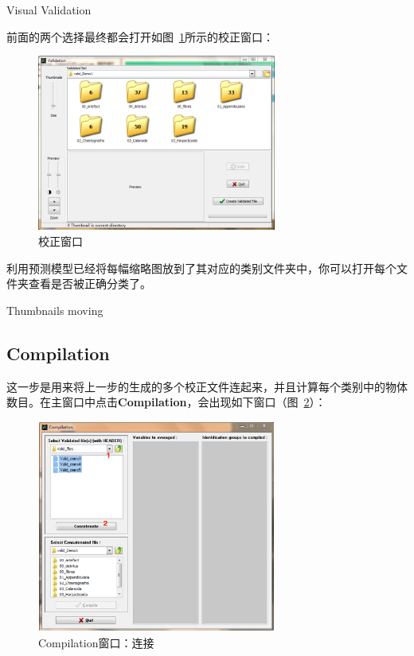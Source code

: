 \documentclass[12pt]{article}
\begin{document}
{\color{red}Visual Validation}

前面的两个选择最终都会打开如图~\ref{fig: ValidationWindow2}所示的校正窗口：

\begin{figure}[!ht]
\centering
\includegraphics[width=0.7\textwidth]{ValidationWindow2.png}
\caption{校正窗口}
\label{fig: ValidationWindow2}
\end{figure}

利用预测模型已经将每幅缩略图放到了其对应的类别文件夹中，你可以打开每个文件夹查看是否被正确分类了。

{\color{red}Thumbnails moving}

\subsection{Compilation}

这一步是用来将上一步的生成的多个校正文件连起来，并且计算每个类别中的物体数目。在主窗口中点击\textbf{Compilation}，会出现如下窗口（图~\ref{fig: CompilationWindow1}）：

\begin{figure}[!ht]
\centering
\includegraphics[width=0.7\textwidth]{CompilationWindow1.eps}
\caption{Compilation窗口：连接}
\label{fig: CompilationWindow1}
\end{figure}
\end{document}
